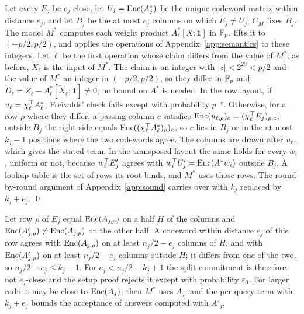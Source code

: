  Let every $E_j$ be $e_j$-close, let $U_j=\mathrm{Enc}(A^*_j)$ be the unique codeword matrix
within distance $e_j$, and let $B_j$ be the at most $e_j$ columns on which $E_j\neq U_j$; $C_M$ fixes
$B_j$. The model $M^*$ computes each weight product $A^*_\ell[X;\mathbf 1]$ in $\mathbb{F}_p$, lifts it to
$(-p/2,p/2)$, and applies the operations of Appendix~\ref{app:semantics} to these integers. Let $\ell$
be the first operation whose claim differs from the value of $M^*$; as before, $\tilde X_\ell$ is the
input of $M^*$. The claim is an integer with $|z|<2^{29}<p/2$ and the value of $M^*$ an integer in
$(-p/2,p/2)$, so they differ in $\mathbb{F}_p$ and $D_\ell=Z_\ell-A^*_\ell[\tilde X_\ell;\mathbf 1]\neq0$; no bound
on $A^*$ is needed. In the row layout, if $u_\ell=\chi_\ell^\top A^*_\ell$, Freivalds' check fails except
with probability $p^{-r}$. Otherwise, for a row $\rho$ where they differ, a passing column $c$
satisfies $\mathrm{Enc}(u_{\ell,\rho})_c=(\chi_\ell^\top E_j)_{\rho,c}$; outside $B_j$ the right side equals
$\mathrm{Enc}((\chi_\ell^\top A^*_\ell)_\rho)_c$, so $c$ lies in $B_j$ or in the at most $k_j-1$ positions where
the two codewords agree. The columns are drawn after $u_\ell$, which gives the stated term. In the
transposed layout the same holds for every $w_i$, uniform or not, because $w_i^\top E'_j$ agrees with
$w_i^\top U'_j=\mathrm{Enc}(A^*w_i)$ outside $B_j$. A lookup table is the set of rows its root binds, and $M^*$
uses those rows. The round-by-round argument of Appendix~\ref{app:sound} carries over with $k_j$
replaced by $k_j+e_j$. \qed

 Let row $\rho$ of $E_j$ equal $\mathrm{Enc}(A_{j,\rho})$ on a half $H$ of the
columns and $\mathrm{Enc}(A'_{j,\rho})\neq\mathrm{Enc}(A_{j,\rho})$ on the other half. A codeword within distance
$e_j$ of this row agrees with $\mathrm{Enc}(A_{j,\rho})$ on at least $n_j/2-e_j$ columns of $H$, and with
$\mathrm{Enc}(A'_{j,\rho})$ on at least $n_j/2-e_j$ columns outside $H$; it differs from one of the two, so
$n_j/2-e_j\le k_j-1$. For $e_j<n_j/2-k_j+1$ the split commitment is therefore not $e_j$-close and the
setup proof rejects it except with probability $\varepsilon_0$. For larger radii it may be close to
$\mathrm{Enc}(A_j)$; then $M^*$ uses $A_j$, and the per-query term with $k_j+e_j$ bounds the acceptance of
answers computed with $A'_j$.

